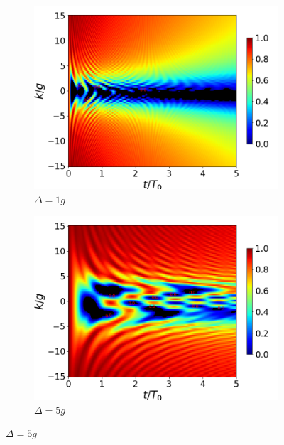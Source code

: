 \begin{figure}[h]
    \centering
    \begin{subfigure}{0.49\textwidth}
        \includegraphics[width=\textwidth]{figuras/ch4/concu/k/eg1+ge1 d=1.0g x=0.0g J=15.0g gamma=0.25g concu k dis.png}
        \caption{$\Delta=1g$}
        \label{fig4:concu k 1 d1}
    \end{subfigure}
    \hfill
    \begin{subfigure}{0.49\textwidth}
        \includegraphics[width=\textwidth]{figuras/ch4/concu/k/eg1+ge1 d=5.0g x=0.0g J=15.0g gamma=0.25g concu k dis.png}
        \caption{$\Delta=5g$}
        \label{fig4:concu k 1 d2}
    \end{subfigure}
    \vfill

\end{figure}
